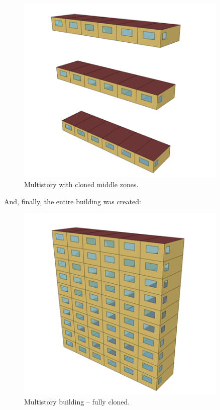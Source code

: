 \begin{figure}[hbtp] %
\centering
\includegraphics[width=0.9\textwidth, height=0.9\textheight, keepaspectratio=true]{media/image008.png}
\caption{Multistory with cloned middle zones. \protect \label{fig:multistory-with-cloned-middle-zones.}}
\end{figure}

And, finally, the entire building was created:

\begin{figure}[hbtp] %
\centering
\includegraphics[width=0.9\textwidth, height=0.9\textheight, keepaspectratio=true]{media/image009.png}
\caption{Multistory building -- fully cloned. \protect \label{fig:multistory-building-fully-cloned.}}
\end{figure}

